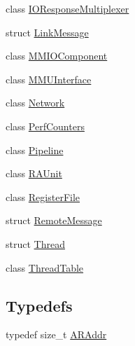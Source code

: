 \begin{DoxyCompactItemize}
class \hyperlink{class_simulator_1_1drisc_1_1_i_o_response_multiplexer}{I\+O\+Response\+Multiplexer}
\item 
struct \hyperlink{struct_simulator_1_1drisc_1_1_link_message}{Link\+Message}
\item 
class \hyperlink{class_simulator_1_1drisc_1_1_m_m_i_o_component}{M\+M\+I\+O\+Component}
\item 
class \hyperlink{class_simulator_1_1drisc_1_1_m_m_u_interface}{M\+M\+U\+Interface}
\item 
class \hyperlink{class_simulator_1_1drisc_1_1_network}{Network}
\item 
class \hyperlink{class_simulator_1_1drisc_1_1_perf_counters}{Perf\+Counters}
\item 
class \hyperlink{class_simulator_1_1drisc_1_1_pipeline}{Pipeline}
\item 
class \hyperlink{class_simulator_1_1drisc_1_1_r_a_unit}{R\+A\+Unit}
\item 
class \hyperlink{class_simulator_1_1drisc_1_1_register_file}{Register\+File}
\item 
struct \hyperlink{struct_simulator_1_1drisc_1_1_remote_message}{Remote\+Message}
\item 
struct \hyperlink{struct_simulator_1_1drisc_1_1_thread}{Thread}
\item 
class \hyperlink{class_simulator_1_1drisc_1_1_thread_table}{Thread\+Table}
\end{DoxyCompactItemize}
\subsection*{Typedefs}
\begin{DoxyCompactItemize}
\item 
typedef size\+\_\+t \hyperlink{namespace_simulator_1_1drisc_ad67fa6022bb8dfc914132e37bbba2e97}{A\+R\+Addr}
\end{DoxyCompactItemize}
